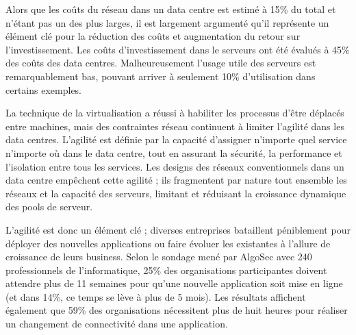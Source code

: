 \par
Alors que les coûts du réseau dans un data centre est estimé à 15\% \cite{cloudCosts} du total et n'étant pas un des plus larges, il est largement argumenté qu'il représente un élément clé pour la réduction des coûts et augmentation du retour sur l'investissement. Les coûts d'investissement dans le serveurs ont été évalués à 45\% des coûts des data centres. Malheureusement l'usage utile des serveurs est remarquablement bas, pouvant arriver à seulement 10\% d'utilisation dans certains exemples.

\par 
La technique de la virtualisation a réussi à habiliter les processus d'être déplacés entre machines, mais des contraintes réseau continuent à limiter l'agilité dans les data centres. L'agilité est définie par la capacité d'assigner n'importe quel service n'importe où dans le data centre, tout en assurant la sécurité, la performance et l'isolation entre tous les services. Les designs des réseaux conventionnels dans un data centre empêchent cette agilité ; ils fragmentent par nature tout ensemble les réseaux et la capacité des serveurs, limitant et réduisant la croissance dynamique des pools de serveur. \cite{cloudCostsAgility}



\par 
L'agilité est donc un élément clé ; diverses entreprises bataillent péniblement pour déployer des nouvelles applications ou faire évoluer les existantes à l'allure de croissance de leurs business. Selon le sondage mené par AlgoSec avec 240 professionnels de l'informatique, 25\% des organisations participantes doivent attendre plus de 11 semaines pour qu'une nouvelle application soit mise en ligne (et dans 14\%, ce temps se lève à plus de 5 mois). Les résultats affichent également que 59\% des organisations nécessitent plus de huit heures pour réaliser un changement de connectivité dans une application. \cite{algoSecSurvey}


